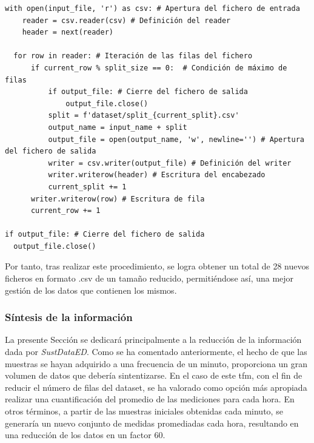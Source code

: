 \vspace{3mm}

\begin{lstlisting}[style=Python, caption={Fragmentación de ficheros iniciales}]
  with open(input_file, 'r') as csv: # Apertura del fichero de entrada
    reader = csv.reader(csv) # Definición del reader
    header = next(reader)  

  for row in reader: # Iteración de las filas del fichero
      if current_row % split_size == 0:  # Condición de máximo de filas
          if output_file: # Cierre del fichero de salida 
              output_file.close()
          split = f'dataset/split_{current_split}.csv'
          output_name = input_name + split
          output_file = open(output_name, 'w', newline='') # Apertura del fichero de salida
          writer = csv.writer(output_file) # Definición del writer
          writer.writerow(header) # Escritura del encabezado
          current_split += 1
      writer.writerow(row) # Escritura de fila
      current_row += 1

if output_file: # Cierre del fichero de salida
  output_file.close()
\end{lstlisting}

\vspace{3mm}

Por tanto, tras realizar este procedimiento, se logra obtener un total de 28 nuevos ficheros en formato .csv de un tamaño reducido, permitiéndose así, una mejor gestión de los datos que contienen los mismos.

\subsubsection{Síntesis de la información}
\label{sec:datasamples}

La presente Sección se dedicará principalmente a la reducción de la información dada por \textit{SustDataED}. Como se ha comentado anteriormente, el hecho de que las muestras se hayan adquirido a una frecuencia de un minuto, proporciona un gran volumen de datos que debería sintentizarse. En el caso de este \gls{tfm}, con el fin de reducir el número de filas del dataset, se ha valorado como opción más apropiada realizar una cuantificación del promedio de las mediciones para cada hora. En otros términos, a partir de las muestras iniciales obtenidas cada minuto, se generaría un nuevo conjunto de medidas promediadas cada hora, resultando en una reducción de los datos en un factor 60.

\vspace{3mm}

